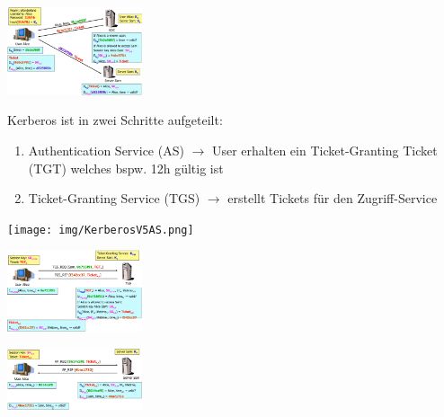 \documentclass{report}
\newenvironment{Figure}
	{\par\medskip\noindent\minipage{\linewidth}}
	{\endminipage\par\medskip}
\theoremstyle{definition}
\theoremstyle{example}
\begin{document}
\begin{Figure}
\centering
\includegraphics[width=150px]{img/Kerberos.png}
	\label{fig:Abbildung des Schemas für ein sehr vereinfachtes Kerberos Protokoll}
\end{Figure}

Kerberos ist in zwei Schritte aufgeteilt:
\begin{enumerate}
	\item Authentication Service (AS) $\rightarrow$ User erhalten ein Ticket-Granting Ticket (TGT) welches bspw. 12h gültig ist
	\item Ticket-Granting Service (TGS) $\rightarrow$ erstellt Tickets für den Zugriff-Service
\end{enumerate}

\begin{Figure}
\centering
\texttt{[image: img/KerberosV5AS.png]}
	\label{fig:Abbildung des Schemas für den AS Kerberos Protokoll Getting a Ticket}
\end{Figure}

\begin{Figure}
\centering
\includegraphics[width=150px]{img/KerberosV5TGT.png}
	\label{fig:Abbildung des Schemas für den AS Kerberos Protokoll Requesting a ticket for accessing server sam}
\end{Figure}

\begin{Figure}
\centering
\includegraphics[width=150px]{img/KerberosV5Authentication.png}
	\label{fig:Abbildung des Schemas für den AS Kerberos Protokoll accessing server sam}
\end{Figure}
\end{document}
